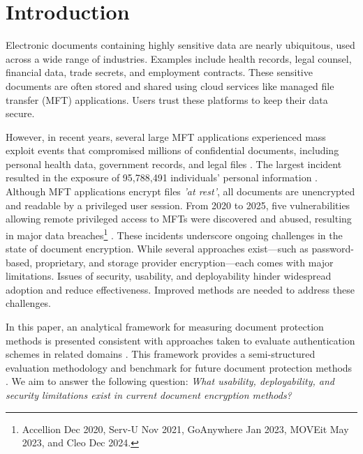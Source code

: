\documentclass[sigconf]{acmart}
\begin{document}
\section{Introduction}
Electronic documents containing highly sensitive data are nearly ubiquitous, used across a wide range of industries. Examples include health records, legal counsel, financial data, trade secrets, and employment contracts. These sensitive documents are often stored and shared using cloud services like managed file transfer (MFT) applications. Users trust these platforms to keep their data secure.

However, in recent years, several large MFT applications
experienced mass exploit events that compromised millions of confidential documents, including personal health data, government records, and legal files \cite{kondruss_moveit_2023}. The largest incident resulted in the exposure of 95,788,491 individuals’ personal
information \cite{simas_unpacking_2023}. Although MFT applications encrypt files \textit{'at rest'}, all documents are unencrypted and readable by a privileged user session. From 2020 to 2025, five vulnerabilities allowing
remote privileged access to MFTs were discovered and abused, resulting in major data breaches\footnote{Accellion Dec 2020, Serv-U Nov 2021, GoAnywhere Jan 2023, MOVEit May 2023, and Cleo Dec 2024.} \cite{cisa_cl0p_2023}. These incidents underscore ongoing challenges in the state of document encryption. While
several approaches exist—such as password-based, proprietary, and storage provider encryption—each comes with major limitations. Issues of security, usability, and deployability hinder widespread adoption and reduce effectiveness. Improved methods are needed to address these challenges.

In this paper, an analytical framework for measuring
document protection methods is presented consistent with approaches taken to evaluate authentication schemes in related domains \cite{alaca_comparative_2021-1, alaca_comparative_2021, bonneau_quest_2012, borisov_sok_2021}. This framework provides a semi-structured evaluation methodology and benchmark for future document protection methods \cite{bonneau_quest_2012}. We aim to answer the following question: \textit{What usability, deployability, and security limitations exist in current document encryption methods?}
\end{document}
